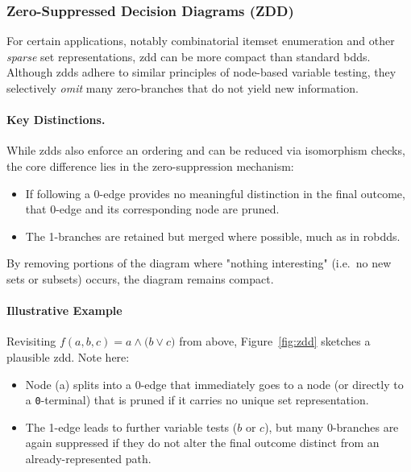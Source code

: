 \subsubsection{Zero-Suppressed Decision Diagrams (ZDD)}
\label{sec:zdd}

For certain applications, notably combinatorial itemset enumeration and other \emph{sparse} set representations, \acrfull{zdd} can be more compact than standard \acrshort{bdd}s. Although \acrshort{zdd}s adhere to similar principles of node-based variable testing, they selectively \emph{omit} many zero-branches that do not yield new information.

\paragraph{Key Distinctions.}
While \acrshort{zdd}s also enforce an ordering and can be reduced via isomorphism checks, the core difference lies in the zero-suppression mechanism:
\begin{itemize}
\item If following a 0-edge provides no meaningful distinction in the final outcome, that 0-edge and its corresponding node are pruned.
\item The 1-branches are retained but merged where possible, much as in \acrshort{robdd}s.
\end{itemize}
By removing portions of the diagram where "nothing interesting" (i.e.\ no new sets or subsets) occurs, the diagram remains compact.

\paragraph{Illustrative Example}
Revisiting $f(a,b,c)=a \land \bigl(b \lor c\bigr)$ from above, Figure~\ref{fig:zdd} sketches a plausible \acrshort{zdd}. Note here:
\begin{itemize}
\item Node (a) splits into a 0-edge that immediately goes to a node (or directly to a \texttt{0}-terminal) that is pruned if it carries no unique set representation.
\item The 1-edge leads to further variable tests ($b$ or $c$), but many 0-branches are again suppressed if they do not alter the final outcome distinct from an already-represented path.
\end{itemize}

